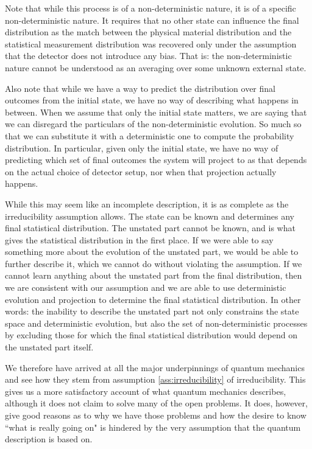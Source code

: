 \documentclass[smallextended]{svjour3}
\numberwithin{equation}{section}
\begin{document}
Note that while this process is of a non-deterministic nature, it is of a specific non-deterministic nature. It requires that no other state can influence the final distribution as the match between the physical material distribution and the statistical measurement distribution was recovered only under the assumption that the detector does not introduce any bias. That is: the non-deterministic nature cannot be understood as an averaging over some unknown external state.

Also note that while we have a way to predict the distribution over final outcomes from the initial state, we have no way of describing what happens in between. When we assume that only the initial state matters, we are saying that we can disregard the particulars of the non-deterministic evolution. So much so that we can substitute it with a deterministic one to compute the probability distribution. In particular, given only the initial state, we have no way of predicting which set of final outcomes the system will project to as that depends on the actual choice of detector setup, nor when that projection actually happens.

While this may seem like an incomplete description, it is as complete as the irreducibility assumption allows. The state can be known and determines any final statistical distribution. The unstated part cannot be known, and is what gives the statistical distribution in the first place. If we were able to say something more about the evolution of the unstated part, we would be able to further describe it, which we cannot do without violating the assumption. If we cannot learn anything about the unstated part from the final distribution, then we are consistent with our assumption and we are able to use deterministic evolution and projection to determine the final statistical distribution. In other words: the inability to describe the unstated part not only constrains the state space and deterministic evolution, but also the set of non-deterministic processes by excluding those for which the final statistical distribution would depend on the unstated part itself.

We therefore have arrived at all the major underpinnings of quantum mechanics and see how they stem from assumption \ref{ass:irreducibility} of irreducibility. This gives us a more satisfactory account of what quantum mechanics describes, although it does not claim to solve many of the open problems. It does, however, give good reasons as to why we have those problems and how the desire to know ``what is really going on" is hindered by the very assumption that the quantum description is based on.
\end{document}
